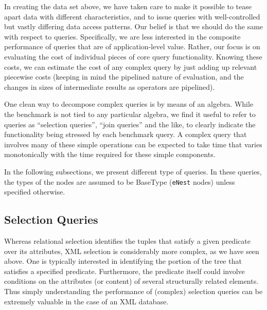 In creating the data set above, we have taken care to make it possible
to tease apart data with different characteristics, and to issue
queries with well-controlled but vastly differing data access
patterns.  Our belief is that we should do the same with respect to
queries.  Specifically, we are less interested in the composite
performance of queries that are of application-level value.  Rather,
our focus is on evaluating the cost of individual pieces of core query
functionality.  Knowing these costs, we can estimate the cost of any
complex query by just adding up relevant piecewise costs (keeping in
mind the pipelined nature of evaluation, and the changes in sizes of
intermediate results as operators are pipelined).

One clean way to decompose complex queries is by means of an algebra.
While the benchmark is not tied to any particular algebra, we find it
useful to refer to queries as ``selection queries'', ``join queries''
and the like, to clearly indicate the functionality being stressed by
each benchmark query.  A complex query that involves many of these
simple operations can be expected to take time that varies
monotonically with the time required for these simple components.

In the following subsections, we present different type of queries.  
In these queries, the types of the nodes are assumed to be {\sf BaseType} 
(\verb=eNest= nodes) unless specified otherwise.


\subsection{Selection Queries}
Whereas relational selection identifies the tuples that satisfy a
given predicate over its attributes, XML selection is considerably
more complex, as we have seen above.  One is typically interested in
identifying the portion of the tree that satisfies a specified
predicate.  Furthermore, the predicate itself could involve conditions
on the attributes (or content) of several structurally related
elements. Thus simply understanding the performance of (complex)
selection queries can be extremely valuable in the case of an XML
database.

